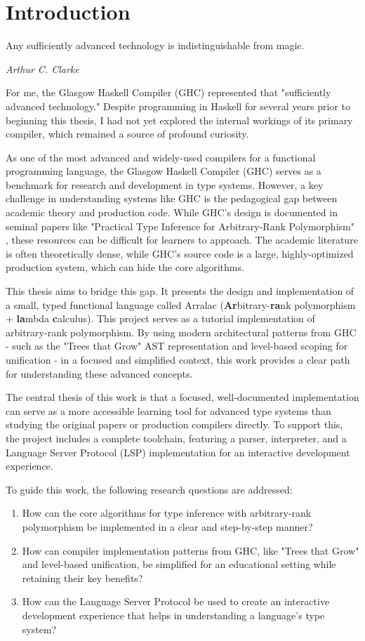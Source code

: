 \chapter{Introduction}
\label{chap:Introduction}

\epigraph{Any sufficiently advanced technology is indistinguishable from magic.}{\textit{Arthur C. Clarke}}

For me, the Glasgow Haskell Compiler (GHC) \cite{ghc-site-2025} represented that "sufficiently advanced technology." Despite programming in Haskell for several years prior to beginning this thesis, I had not yet explored the internal workings of its primary compiler, which remained a source of profound curiosity.

As one of the most advanced and widely-used compilers for a functional programming language, the Glasgow Haskell Compiler (GHC) serves as a benchmark for research and development in type systems. However, a key challenge in understanding systems like GHC is the pedagogical gap between academic theory and production code. While GHC's design is documented in seminal papers like "Practical Type Inference for Arbitrary-Rank Polymorphism" \cite{jones-practical-2007}, these resources can be difficult for learners to approach. The academic literature is often theoretically dense, while GHC's source code is a large, highly-optimized production system, which can hide the core algorithms.

This thesis aims to bridge this gap. It presents the design and implementation of a small, typed functional language called Arralac (\textbf{Ar}bitrary-\textbf{ra}nk polymorphism + \textbf{la}mbda \textbf{c}alculus). This project serves as a tutorial implementation of arbitrary-rank polymorphism. By using modern architectural patterns from GHC - such as the "Trees that Grow" AST representation and level-based scoping for unification - in a focused and simplified context, this work provides a clear path for understanding these advanced concepts.

The central thesis of this work is that a focused, well-documented implementation can serve as a more accessible learning tool for advanced type systems than studying the original papers or production compilers directly. To support this, the project includes a complete toolchain, featuring a parser, interpreter, and a Language Server Protocol (LSP) implementation for an interactive development experience.

To guide this work, the following research questions are addressed:
\begin{enumerate}
    \item How can the core algorithms for type inference with arbitrary-rank polymorphism be implemented in a clear and step-by-step manner?
    \item How can compiler implementation patterns from GHC, like "Trees that Grow" and level-based unification, be simplified for an educational setting while retaining their key benefits?
    \item How can the Language Server Protocol be used to create an interactive development experience that helps in understanding a language's type system?
\end{enumerate}

